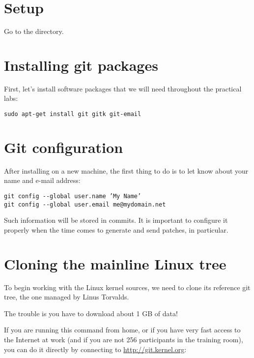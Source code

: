 
\section{Setup}

Go to the  directory.

\section{Installing git packages}

First, let's install software packages that we will need
throughout the practical labs:

\begin{verbatim}
sudo apt-get install git gitk git-email
\end{verbatim}

\section{Git configuration}

After installing  on a new machine, the first thing to do is
to let  know about your name and e-mail address:

\begin{verbatim}
git config --global user.name ’My Name’
git config --global user.email me@mydomain.net
\end{verbatim}

Such information will be stored in commits. It is important
to configure it properly when the time comes to generate and
send patches, in particular.

\section{Cloning the mainline Linux tree}

To begin working with the Linux kernel sources, we need to clone its
reference git tree, the one managed by Linus Torvalds.

The trouble is you have to download about 1 GB of data!

If you are running this command from home, or if you have very fast
access to the Internet at work (and if you are not 256 participants in the
training room), you can do it directly by connecting to
\url{http://git.kernel.org}:

